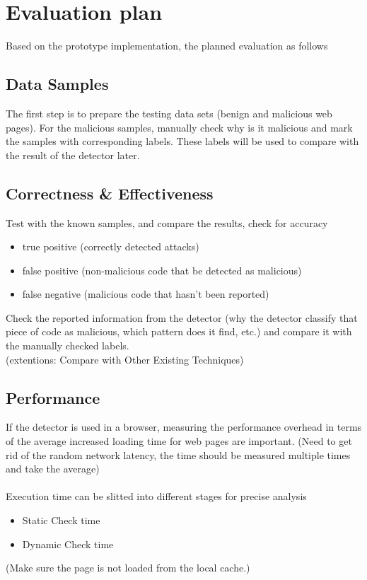 \documentclass[11pt]{article}
\begin{document}
\section{Evaluation plan}
Based on the prototype implementation, the planned evaluation as follows 
\subsection{Data Samples}
The first step is to prepare the testing data sets (benign and malicious web pages). For the malicious samples, manually check why is it malicious and mark the samples with corresponding labels. These labels will be used to compare with the result of the detector later.
\subsection{Correctness \& Effectiveness}
Test with the known samples, and compare the results, check for accuracy 
\begin{itemize}
  	\item true positive (correctly detected attacks)
  	\item false positive (non-malicious code that be detected as malicious)
  	\item false negative (malicious code that hasn't been reported)
\end{itemize}
Check the reported information from the detector (why the detector classify that piece of code as malicious, which pattern does it find, etc.) and compare it with the manually checked labels.
\\
(extentions: Compare with Other Existing Techniques)

\subsection{Performance}
If the detector is used in a browser, measuring the performance overhead in terms of the average increased loading time for web pages are important. (Need to get rid of  the random network latency, the time should be measured multiple times and take the average)
\\ \\
Execution time can be slitted into different stages for precise analysis
\begin{itemize}
  	\item Static Check time
  	\item Dynamic Check time
\end{itemize}
(Make sure the page is not loaded from the local cache.)
\end{document}

